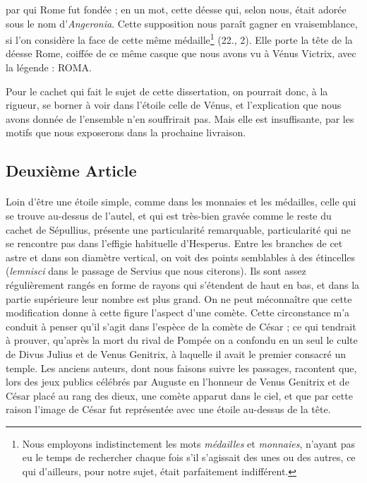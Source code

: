 \documentclass[a4paper, 11pt, oneside, polutonikogreek, french]{article}
\begin{document}
par qui Rome fut fondée ; en un mot, cette déesse qui, selon nous, était adorée sous le nom d'\emph{Angeronia}. Cette supposition nous paraît gagner en vraisemblance, si l'on considère la face de cette même médaille\footnote{Nous employons indistinctement les mots \emph{médailles} et \emph{monnaies}, n'ayant pas eu le temps de rechercher chaque fois s'il s'agissait des unes ou des autres, ce qui d'ailleurs, pour notre sujet, était parfaitement indifférent.} (22., 2). Elle porte la tête de la déesse Rome, coiffée de ce même casque que nous avons vu à Vénus Victrix, avec la légende : ROMA.

Pour le cachet qui fait le sujet de cette dissertation, on pourrait donc, à la rigueur, se borner à voir dans l'étoile celle de Vénus, et l'explication que nous avons donnée de l'ensemble n'en souffrirait pas. Mais elle est insuffisante, par les motifs que nous exposerons dans la prochaine livraison.
\subsection{Deuxième Article}
\paragraph{}
Loin d'être une étoile simple, comme dans les monnaies et les médailles, celle qui se trouve au-dessus de l'autel, et qui est très-bien gravée comme le reste du cachet de Sépullius, présente une particularité remarquable, particularité qui ne se rencontre pas dans l'effigie habituelle d'Hesperus. Entre les branches de cet astre et dans son diamètre vertical, on voit des points semblables à des étincelles (\emph{lemnisci} dans le passage de Servius que nous citerons). Ils sont assez régulièrement rangés en forme de rayons qui s'étendent de haut en bas, et dans la partie supérieure leur nombre est plus grand. On ne peut méconnaître que cette modification donne à cette figure l'aspect d'une comète. Cette circonstance m'a conduit à penser qu'il s'agit dans l'espèce de la comète de César ; ce qui tendrait à prouver, qu'après la mort du rival de Pompée on a confondu en un seul le culte de Divus Julius et de Venus Genitrix, à laquelle il avait le premier consacré un temple. Les anciens auteurs, dont nous faisons suivre les passages, racontent que, lors des jeux publics célébrés par Auguste en l'honneur de Venus Genitrix et de César placé au rang des dieux, une comète apparut dans le ciel, et que par cette raison l'image de César fut représentée avec une étoile au-dessus de la tête.
\end{document}
